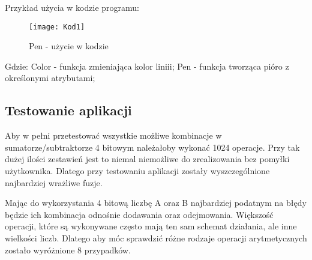 \documentclass[12pt, a4paper, onside, polish]{article}				%
\begin{document}
\begin{enumerate}
Przykład użycia w kodzie programu:
   	\begin{figure}[H]
  	  {\centering \texttt{[image: Kod1]} \caption{Pen - użycie w kodzie}}
  	 \end{figure}
Gdzie: \newline
Color - funkcja zmieniająca kolor liniii; \newline
Pen - funkcja tworząca pióro z określonymi atrybutami; \newline
 
  	 
 \end{enumerate}


\subsection{Testowanie aplikacji}
\hspace{\parindent}
Aby w pełni przetestować wszystkie możliwe kombinacje w sumatorze/subtraktorze 4 bitowym należałoby wykonać 1024 operacje. Przy tak dużej ilości zestawień jest to niemal niemożliwe do zrealizowania bez pomyłki użytkownika. Dlatego przy testowaniu aplikacji zostały wyszczególnione najbardziej wrażliwe fuzje.  

Mając do wykorzystania 4 bitową liczbę A oraz B najbardziej podatnym na błędy będzie ich kombinacja odnośnie dodawania oraz odejmowania. Większość operacji, które są wykonywane często mają ten sam schemat działania, ale inne wielkości liczb. Dlatego aby móc sprawdzić różne rodzaje operacji arytmetycznych zostało wyróżnione 8 przypadków.  
\end{document}
